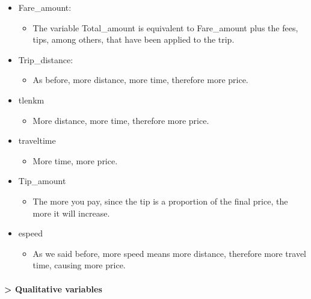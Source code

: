 \documentclass[
  18pt,
  a4paper]{article}
\providecommand{\tightlist}{%
  \setlength{\itemsep}{0pt}\setlength{\parskip}{0pt}}
\begin{document}
\begin{itemize}
\tightlist
\item
  Fare\_amount:

  \begin{itemize}
  \tightlist
  \item
    The variable Total\_amount is equivalent to Fare\_amount plus the
    fees, tips, among others, that have been applied to the trip.
  \end{itemize}
\item
  Trip\_distance:

  \begin{itemize}
  \tightlist
  \item
    As before, more distance, more time, therefore more price.
  \end{itemize}
\item
  tlenkm

  \begin{itemize}
  \tightlist
  \item
    More distance, more time, therefore more price.
  \end{itemize}
\item
  traveltime

  \begin{itemize}
  \tightlist
  \item
    More time, more price.
  \end{itemize}
\item
  Tip\_amount

  \begin{itemize}
  \tightlist
  \item
    The more you pay, since the tip is a proportion of the final price,
    the more it will increase.
  \end{itemize}
\item
  espeed

  \begin{itemize}
  \tightlist
  \item
    As we said before, more speed means more distance, therefore more
    travel time, causing more price.
  \end{itemize}
\end{itemize}

\hypertarget{qualitative-variables}{%
\paragraph{\textgreater{} Qualitative
variables}\label{qualitative-variables}}
\end{document}
